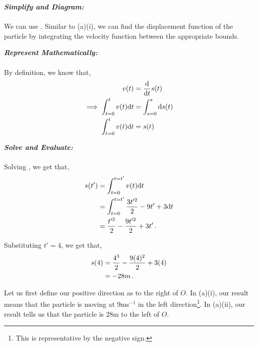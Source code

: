 \begin{subquestions}
\begin{subsubquestions}

\subsubquestion

\textbf{\textit{Simplify and Diagram:}} \\ \\
We can use . Similar to (a)(i), we can find the displacement function of the particle by integrating the velocity function between the appropriate bounds.




\textbf{\textit{Represent Mathematically:}} \\ \\
By definition, we know that,
\begin{align}
	v(t) & = \frac{\mathrm{d}}{\mathrm{d}t}s(t) \nonumber \\
	\implies \int_{t=0}^{t}v(t)\mathrm{d} t & = \int_{s=0}^{s} \mathrm{d} s(t) \nonumber \\
	\int_{t=0}^{t}v(t)\mathrm{d} t & = s(t)  \label{2009:q6:SEqn1}
\end{align}




\textbf{\textit{Solve and Evaluate:}} \\ \\
Solving , we get that,
\begin{align}
	s(t') & = \int_{t=0}^{t=t'} v(t)\mathrm{d} t \nonumber \\
	      & = \int_{t=0}^{t=t'} \frac{3t'^2}{2}-9t' +3 \mathrm{d} t \nonumber \\
	      & = \frac{t'^3}{2} - \frac{9t'^2}{2} + 3t' \,.
\end{align}

Substituting $t'=4$, we get that,
\begin{align}
	s(4) & = \frac{4^3}{2} - \frac{9(4)^2}{2} + 3(4) \nonumber \\
	     & = -28m\,.
\end{align}
	
\end{subsubquestions}


\subquestion

Let us first define our positive direction as to the right of $O$. In (a)(i), our result means that the particle is moving at 9ms$^{-1}$ in the left direction\footnote{This is representative by the negative sign.}. In (a)(ii), our result tells us that the particle is 28m to the left of $O$.


\end{subquestions}

